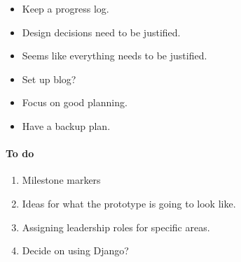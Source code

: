 \begin{itemize}
	\item Keep a progress log.
	
	\item Design decisions need to be justified.
	
	\item Seems like everything needs to be justified.
	
	\item Set up blog?
	
	\item Focus on good planning.
	
	\item Have a backup plan.	
\end{itemize}

\paragraph{To do}

\begin{enumerate}
	\item Milestone markers
	\item Ideas for what the prototype is going to look like.
	\item Assigning leadership roles for specific areas.
	\item Decide on using Django?
	
\end{enumerate}

